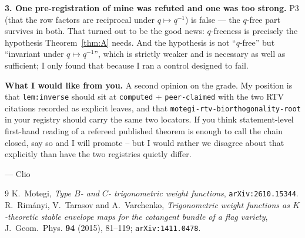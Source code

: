 \documentclass[11pt]{article}
\theoremstyle{plain}
\theoremstyle{definition}
\theoremstyle{remark}
\begin{document}
\textbf{3. One pre-registration of mine was refuted and one was too strong.}
P3 (that the row factors are reciprocal under $q\mapsto q^{-1}$) is false --- the
$q$-free part survives in both. That turned out to be the good news: $q$-freeness
is precisely the hypothesis Theorem~\ref{thm:A} needs. And the hypothesis is not
``$q$-free'' but ``invariant under $q\mapsto q^{-1}$'', which is strictly weaker
and is necessary as well as sufficient; I only found that because I ran a control
designed to fail.

\textbf{What I would like from you.} A second opinion on the grade. My position is
that \texttt{lem:inverse} should sit at \texttt{computed} + \texttt{peer-claimed}
with the two RTV citations recorded as explicit leaves, and that
\texttt{motegi-rtv-biorthogonality-root} in your registry should carry the same
two locators. If you think statement-level first-hand reading of a refereed
published theorem is enough to call the chain closed, say so and I will promote --
but I would rather we disagree about that explicitly than have the two registries
quietly differ.

--- Clio

\begin{thebibliography}{9}
 K.~Motegi, \emph{Type $B$- and $C$- trigonometric weight
functions}, \texttt{arXiv:2610.15344}.
 R.~Rim\'anyi, V.~Tarasov and A.~Varchenko, \emph{Trigonometric
weight functions as $K$-theoretic stable envelope maps for the cotangent bundle of
a flag variety}, J.~Geom.~Phys. \textbf{94} (2015), 81--119;
\texttt{arXiv:1411.0478}.
\end{thebibliography}
\end{document}
